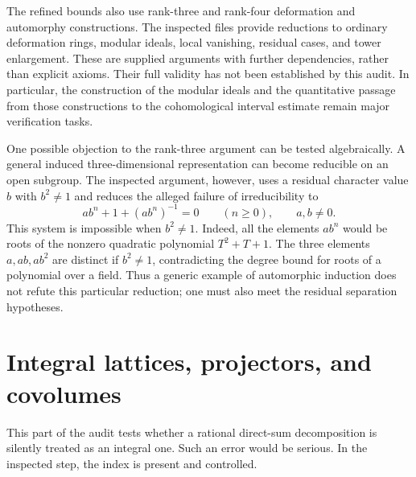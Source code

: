 \documentclass[11pt,a4paper]{article}
\theoremstyle{remark}
\newcommand{\src}[1]{\cite{#1}}
\begin{document}
The refined bounds also use rank-three and rank-four deformation and automorphy constructions. The inspected files provide reductions to ordinary deformation rings, modular ideals, local vanishing, residual cases, and tower enlargement. These are supplied arguments with further dependencies, rather than explicit axioms. Their full validity has not been established by this audit. In particular, the construction of the modular ideals and the quantitative passage from those constructions to the cohomological interval estimate remain major verification tasks. \src{S-automorphy}

One possible objection to the rank-three argument can be tested algebraically. A general induced three-dimensional representation can become reducible on an open subgroup. The inspected argument, however, uses a residual character value $b$ with $b^2\ne1$ and reduces the alleged failure of irreducibility to
\[
 a b^n+1+(a b^n)^{-1}=0\qquad(n\ge0),
 \qquad a,b\ne0.
\]
This system is impossible when $b^2\ne1$. Indeed, all the elements $ab^n$ would be roots of the nonzero quadratic polynomial $T^2+T+1$. The three elements $a,ab,ab^2$ are distinct if $b^2\ne1$, contradicting the degree bound for roots of a polynomial over a field. Thus a generic example of automorphic induction does not refute this particular reduction; one must also meet the residual separation hypotheses. \src{S-irreducibility}

\section{Integral lattices, projectors, and covolumes}\label{sec:integral}
This part of the audit tests whether a rational direct-sum decomposition is silently treated as an integral one. Such an error would be serious. In the inspected step, the index is present and controlled.
\end{document}
